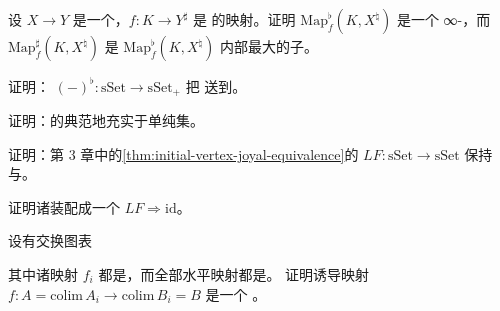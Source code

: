 \begin{exercise}\label{ex:map-flat-sharp}
设 $X \to Y$ 是一个\trCocartesianFibration{}，$f\colon K \to Y^{\sharp}$ 是%
\trMarkedSimplicialSet{}的映射。证明 $\mathrm{Map}^{\flat}_{f}(K, X^{\natural})$ 是一个
∞-\trCategory{}，而 $\mathrm{Map}^{\sharp}_{f}(K, X^{\natural})$ 是
$\mathrm{Map}^{\flat}_{f}(K, X^{\natural})$ 内部最大的子\trInfinityGroupoid{}。
\end{exercise}

\begin{exercise}\label{ex:flat-marked-equivalence}
证明：\trFunctor{} $(-)^{\flat}\colon \mathrm{sSet} \to \mathrm{sSet}_+$ 把%
\trJoyalEquivalence{}送到\trMarkedEquivalence{}。
\end{exercise}

\begin{exercise}\label{ex:marked-simplicial-enriched}
证明：\trMarkedSimplicialSet{}的\trCategory{}典范地充实于单纯集。
\end{exercise}

\begin{exercise}\label{ex:LF-preserves-colimits}
证明：第 3 章中的\cref{thm:initial-vertex-joyal-equivalence}的\trFunctor{}%
$LF\colon \mathrm{sSet} \to \mathrm{sSet}$ 保持\trColimit{}与\trMonomorphism{}。
\end{exercise}

\begin{exercise}\label{ex:initial-vertex-natural-transformation}
证明诸\trInitialVertexMap{}装配成一个\trNaturalTransformation{} $LF \Rightarrow \mathrm{id}$。
\end{exercise}

\begin{exercise}\label{ex:colim-joyal-equivalence-sequential}
设有交换图表
\begin{center}
\end{center}
其中诸映射 $f_i$ 都是\trJoyalEquivalence{}，而全部水平映射都是\trMonomorphism{}。
证明诱导映射 $f\colon A = \mathrm{colim}\, A_i \to \mathrm{colim}\, B_i = B$ 是一个%
\trJoyalEquivalence{}。
\end{exercise}

